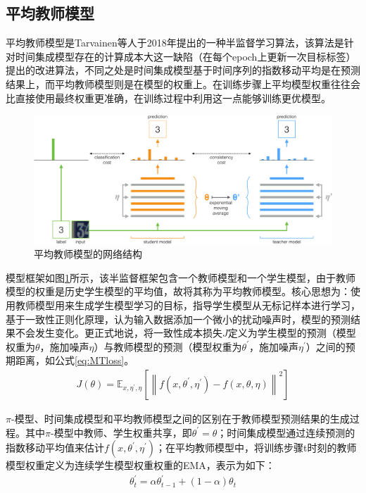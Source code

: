 \documentclass[lang=chs, degree=master, blindreview=false, adobe=false]{yanputhesis}
\begin{document}
\subsection{平均教师模型}
平均教师模型是Tarvainen等人\cite{Tarvainen2017teacher}于2018年提出的一种半监督学习算法，该算法是针对时间集成模型存在的计算成本大这一缺陷（在每个epoch上更新一次目标标签）提出的改进算法，不同之处是时间集成模型基于时间序列的指数移动平均是在预测结果上，而平均教师模型则是在模型的权重上。在训练步骤上平均模型权重往往会比直接使用最终权重更准确，在训练过程中利用这一点能够训练更优模型。
\begin{figure}[htb]
  \centering
  \includegraphics[scale=0.35]{images/mean-teacher.png}
  \caption{
    平均教师模型的网络结构\cite{Tarvainen2017teacher}
  }
  \label{fig:MTfram}
\end{figure}

模型框架如图\ref{fig:MTfram}所示，该半监督框架包含一个教师模型和一个学生模型，由于教师模型的权重是历史学生模型的平均值，故将其称为平均教师模型。核心思想为：使用教师模型用来生成学生模型学习的目标，指导学生模型从无标记样本进行学习，基于一致性正则化原理，认为输入数据添加一个微小的扰动噪声时，模型的预测结果不会发生变化。更正式地说，将一致性成本损失$J$定义为学生模型的预测（模型权重为$\theta$，施加噪声$\eta$）与教师模型的预测（模型权重为$\theta^{\prime}$，施加噪声$\eta^{\prime}$）之间的预期距离，如公式\ref{eq:MTloss}。
\begin{equation}
  \label{eq:MTloss}
  \begin{aligned}
    J(\theta)=\mathbb{E}_{x, \eta^{\prime}, \eta}\left[\left\|f\left(x, \theta^{\prime}, \eta^{\prime}\right)-f(x, \theta, \eta)\right\|^{2}\right]
    \end{aligned}
\end{equation}

$\pi$-模型、时间集成模型和平均教师模型之间的区别在于教师模型预测结果的生成过程。其中$\pi$-模型中教师、学生权重共享，即$\theta^{\prime} = \theta$；时间集成模型通过连续预测的指数移动平均值来估计$f\left(x, \theta^{\prime}, \eta^{\prime}\right)$；在平均教师模型中，将训练步骤t时刻的教师模型权重定义为连续学生模型权重权重的EMA，表示为如下：
\begin{equation}
  \label{eq:MTema}
  \begin{aligned}
    \theta_{t}^{\prime}=\alpha \theta_{t-1}^{\prime}+(1-\alpha) \theta_{t}
    \end{aligned}
\end{equation}
\end{document}
